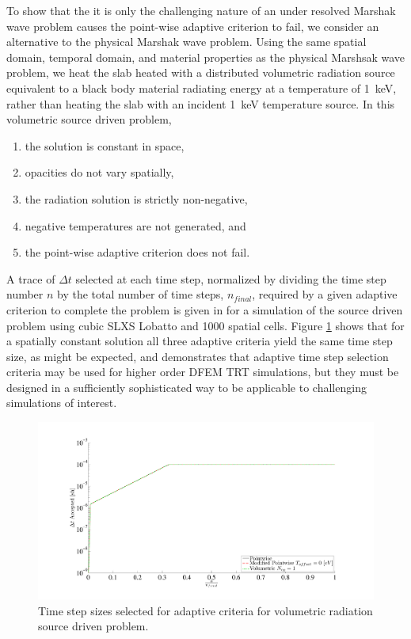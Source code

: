 To show that the it is only the challenging nature of an under resolved Marshak wave problem causes the point-wise adaptive criterion to fail,  we consider an alternative to the physical Marshak wave problem.
Using the same spatial domain, temporal domain, and material properties as the physical Marshsak wave problem, we heat the slab heated with  a distributed volumetric radiation source equivalent to a black body material radiating energy at a temperature of 1~keV, rather than heating the slab with an incident 1~keV temperature source.
In this volumetric source driven problem, 
\begin{enumerate}
\item the solution is constant in space, 
\item opacities do not vary spatially,
\item the radiation solution is strictly non-negative, 
\item negative temperatures are not generated, and
\item the point-wise adaptive criterion does not fail.
\end{enumerate}
A trace of $\Delta t$ selected at each time step, normalized by dividing the time step number $n$ by the total number of time steps, $n_{final}$, required by a given adaptive criterion to complete the problem is given in  for a simulation of the source driven problem using cubic SLXS Lobatto and 1000 spatial cells.
Figure \ref{fig:source_trace} shows that for a spatially constant solution all three adaptive criteria yield the same time step size, as might be expected, and demonstrates that adaptive time step selection criteria may be used for higher order DFEM TRT simulations, but they must be designed in a sufficiently sophisticated way to be applicable to challenging simulations of interest.
\begin{figure}[!htp]
\centering
\includegraphics[width=16cm,trim=2in  0.4in 0.5in 0.75in,clip=true]{chapter6_grey_radtran/Dissertation_Data/Source_dt_trace.pdf}
\caption{Time step sizes selected for adaptive criteria for volumetric radiation source driven problem.}
\label{fig:source_trace}
\end{figure}

